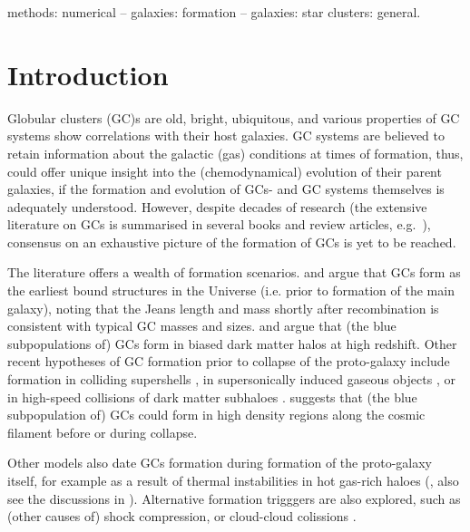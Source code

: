 \documentclass[a4paper,fleqn,usenatbib]{mnras}
\begin{document}
\begin{keywords}
methods: numerical -- galaxies: formation -- galaxies: star clusters: general.
\end{keywords}



\section{Introduction}
Globular clusters (GC)s are old, bright, ubiquitous, and various properties of
GC systems show correlations with their host galaxies. GC systems are believed to
retain information about the galactic (gas) conditions at times of formation,
thus, could offer unique insight into the (chemodynamical) evolution of their 
parent galaxies, if the formation and evolution of GCs- and GC systems themselves 
is adequately understood. However, despite decades of research (the extensive 
literature on GCs is summarised in several books and review articles, e.g.~\citealt{
1991ARA&A..29..543H, Harris2001, 2004Natur.427...31W, 2006ARA&A..44..193B, 
2012A&ARv..20...50G, 2014CQGra..31x4006K, 2018RSPSA.47470616F}), consensus on an 
exhaustive picture of the formation of GCs is yet to be reached.

The literature offers a wealth of formation scenarios. \citet{1968ApJ...154..891P}
and \citet{1984ApJ...277..470P} argue that GCs form as the earliest bound
structures in the Universe (i.e. prior to formation of the main galaxy), 
noting that the Jeans length and mass shortly after recombination is consistent
with typical GC masses and sizes. \citet{2005MNRAS.364..367D} and \citet{
2009ApJ...706L.192B} argue that (the blue subpopulations of) GCs form in biased 
dark matter halos at high redshift. Other recent hypotheses of GC formation prior 
to collapse of the proto-galaxy include formation in colliding supershells 
\citep{2017Ap&SS.362..183R}, in supersonically induced gaseous objects
\citep{2019arXiv190408941C}, or in high-speed collisions of dark matter subhaloes
\citep{2019arXiv190508951M}. \citet{2017MNRAS.472.3120B} suggests
that (the blue subpopulation of) GCs could form in high density regions along
the cosmic filament before or during collapse.

Other models also date GCs formation during formation of the proto-galaxy itself,
for example as a result of thermal instabilities in hot gas-rich haloes 
(\citealt{1985ApJ...298...18F}, also see the discussions in \citealt{
1990ApJ...363..488K}). Alternative formation trigggers are also explored, such as 
(other causes of) shock compression, or cloud-cloud colissions \citep[e.g.][]{
1980glcl.conf..301G, 1992ApJ...400..265M, 1994ApJ...429..177H, 1995ApJ...442..618V,
1996ASPC...92..241L, 2001ApJ...560..592C}. 
\end{document}
